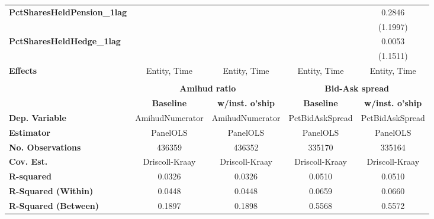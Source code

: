 {\begin{longtable}{>{\bfseries}lcccc}
\textbf{PctSharesHeldPension\_1lag}        &                     &                                &                     &              0.2846              \\
\textbf{ }                                 &                     &                                &                     &             (1.1997)             \\
\textbf{PctSharesHeldHedge\_1lag}          &                     &                                &                     &              0.0053              \\
\textbf{ }                                 &                     &                                &                     &             (1.1511)             \\
\midrule
\textbf{Effects}                           &        Entity, Time       &             Entity, Time        &        Entity, Time       &              Entity, Time              \\
\bottomrule
\bigskip\\
\toprule
& \multicolumn{2}{c}{\textbf{Amihud ratio}} &  \multicolumn{2}{c}{\textbf{Bid-Ask spread}}\\
\midrule
&   \textbf{Baseline}   & \textbf{w/inst. o'ship} &   \textbf{Baseline}  & \textbf{w/inst. o'ship}  \\
\midrule
\textbf{Dep. Variable}                     &   AmihudNumerator   &        AmihudNumerator         &   PctBidAskSpread   &         PctBidAskSpread          \\
\textbf{Estimator}                         &       PanelOLS      &            PanelOLS            &       PanelOLS      &             PanelOLS             \\
\textbf{No. Observations}                  &        436359       &             436352             &        335170       &              335164              \\
\textbf{Cov. Est.}                         &    Driscoll-Kraay   &         Driscoll-Kraay         &    Driscoll-Kraay   &          Driscoll-Kraay          \\
\textbf{R-squared}                         &        0.0326       &             0.0326             &        0.0510       &              0.0510              \\
\textbf{R-Squared (Within)}                &        0.0448       &             0.0448             &        0.0659       &              0.0660              \\
\textbf{R-Squared (Between)}               &        0.1897       &             0.1898             &        0.5568       &              0.5572              \\

\end{longtable}}
